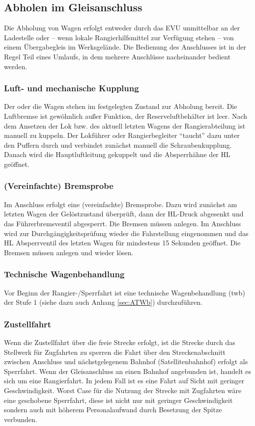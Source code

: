 \subsection{Abholen im Gleisanschluss}
Die Abholung von Wagen erfolgt entweder durch das \acrshort{EVU} unmittelbar an der Ladestelle oder -- wenn lokale Rangierhilfsmittel zur Verfügung stehen -- von einem Übergabegleis im Werksgelände. Die Bedienung des Anschlusses ist in der Regel Teil eines Umlaufs, in dem mehrere Anschlüsse nacheinander bedient werden.
\subsubsection{Luft- und mechanische Kupplung}\label{sec:LuftumechKup}
Der oder die Wagen stehen im festgelegten Zustand zur Abholung bereit. Die Luftbremse ist gewöhnlich außer Funktion, der Reserveluftbehälter ist leer. Nach dem Ansetzen der Lok bzw. des aktuell letzten Wagens der Rangierabteilung ist manuell zu kuppeln. Der Lokführer oder Rangierbegleiter "`taucht"' dazu unter den Puffern durch und verbindet zunächst manuell die Schraubenkupplung. Danach wird die Hauptluftleitung gekuppelt und die Absperrhähne der \acrshort{HL} geöffnet. %
\subsubsection{(Vereinfachte) Bremsprobe}\label{sec:vBremsprobe}
Im Anschluss erfolgt eine (vereinfachte) \gls{Bremsprobe}. Dazu wird zunächst am letzten Wagen der Gelöstzustand überprüft, dann der \acrshort{HL}-Druck abgesenkt und das Führerbremsventil abgesperrt. Die Bremsen müssen anlegen. Im Anschluss wird zur Durchgängigkeitsprüfung wieder die Fahrstellung eingenommen und das \acrshort{HL} Absperrventil des letzten Wagen für mindestens 15 Sekunden geöffnet. Die Bremsen müssen anlegen und wieder lösen.
\subsubsection{Technische Wagenbehandlung}\label{sec:tWb}
Vor Beginn der Rangier-/\gls{Sperrfahrt} ist eine technische Wagenbehandlung (\acrshort{twb}) der Stufe 1 (siehe dazu auch Anhang \ref{sec:ATWb}) durchzuführen. 
\subsubsection{Zustellfahrt}\label{sec:Zustellfahrt}
Wenn die Zustellfahrt über die freie Strecke erfolgt, ist die Strecke durch das Stellwerk für \gls{Zugfahrt}en zu sperren die Fahrt über den Streckenabschnitt zwischen Anschluss und nächstgelegenem Bahnhof (\gls{Satellitenbahnhof}) erfolgt als \gls{Sperrfahrt}. Wenn der \gls{Gleisanschluss} an einen Bahnhof angebunden ist, handelt es sich um eine \gls{Rangierfahrt}. In jedem Fall ist es eine Fahrt auf Sicht mit geringer Geschwindigkeit. Worst Case für die Nutzung der Strecke mit \gls{Zugfahrt}en wäre eine geschobene \gls{Sperrfahrt}, diese ist nicht nur mit geringer Geschwindigkeit sondern auch mit höherem Personalaufwand durch Besetzung der Spitze verbunden.

